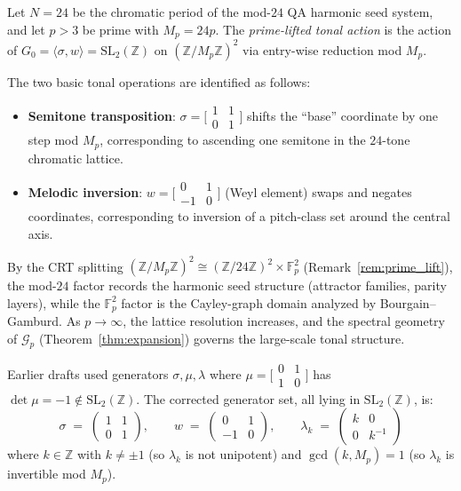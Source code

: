 \begin{definition}
  \label{def:tonal_action}
  Let $N = 24$ be the chromatic period of the mod-$24$ QA harmonic seed system,
  and let $p > 3$ be prime with $M_p = 24p$.  The \emph{prime-lifted tonal action}
  is the action of $G_0 = \langle \sigma, w \rangle = \mathrm{SL}_2(\mathbb{Z})$ on
  $(\mathbb{Z}/M_p\mathbb{Z})^2$ via entry-wise reduction mod $M_p$.

  The two basic tonal operations are identified as follows:
  \begin{itemize}
    \item \textbf{Semitone transposition}: $\sigma = \bigl[\begin{smallmatrix}1&1\\0&1\end{smallmatrix}\bigr]$
      shifts the ``base'' coordinate by one step mod $M_p$, corresponding to ascending
      one semitone in the $24$-tone chromatic lattice.
    \item \textbf{Melodic inversion}: $w = \bigl[\begin{smallmatrix}0&1\\-1&0\end{smallmatrix}\bigr]$
      (Weyl element) swaps and negates coordinates, corresponding to inversion of a
      pitch-class set around the central axis.
  \end{itemize}

  By the CRT splitting $(\mathbb{Z}/M_p\mathbb{Z})^2 \cong
  (\mathbb{Z}/24\mathbb{Z})^2 \times \mathbb{F}_p^2$ (Remark~\ref{rem:prime_lift}),
  the mod-$24$ factor records the harmonic seed structure (attractor families, parity
  layers), while the $\mathbb{F}_p^2$ factor is the Cayley-graph domain analyzed by
  Bourgain--Gamburd.  As $p \to \infty$, the lattice resolution increases, and the
  spectral geometry of $\mathcal{G}_p$ (Theorem~\ref{thm:expansion}) governs the
  large-scale tonal structure.
\end{definition}

Earlier drafts used generators $\sigma, \mu, \lambda$ where
$\mu = \bigl[\begin{smallmatrix}0&1\\1&0\end{smallmatrix}\bigr]$ has
$\det \mu = -1 \notin \mathrm{SL}_2(\mathbb{Z})$.
The corrected generator set, all lying in $\mathrm{SL}_2(\mathbb{Z})$, is:
\[
  \sigma \;=\; \begin{pmatrix} 1 & 1 \\ 0 & 1 \end{pmatrix}, \qquad
  w \;=\; \begin{pmatrix} 0 & 1 \\ -1 & 0 \end{pmatrix}, \qquad
  \lambda_k \;=\; \begin{pmatrix} k & 0 \\ 0 & k^{-1} \end{pmatrix}
\]
where $k \in \mathbb{Z}$ with $k \neq \pm 1$ (so $\lambda_k$ is not unipotent) and
$\gcd(k, M_p) = 1$ (so $\lambda_k$ is invertible mod $M_p$).

